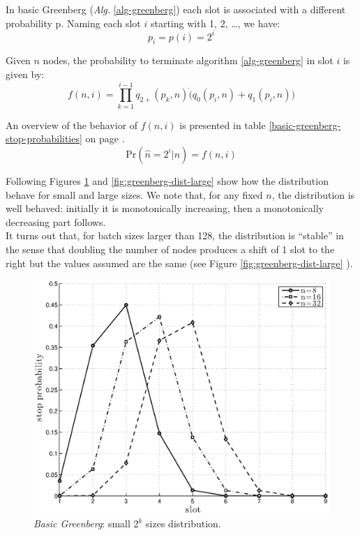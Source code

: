 \documentclass[12pt,a4paper]{report}
\begin{document}
In basic Greenberg (\emph{Alg.} \ref{alg-greenberg}) each slot is associated with a different probability p. Naming each slot $i$ starting with 1, 2, \dots, we have:
\begin{equation}
	p_{i}=p(i)=2^{i}
\end{equation}

Given $n$ nodes, the probability to terminate algorithm \ref{alg-greenberg} in slot $i$ is given by:
\begin{equation}
f(n,i)=\prod_{k=1}^{i-1}q_{2+}(p_{k},n) \dot (q_{0}(p_{i},n)+q_{1}(p_{i},n))  
\label{eq:bgstopprobability}
\end{equation}

An overview of the behavior of $f(n,i)$ is presented in table \ref{basic-greenberg-stop-probabilities} on page \pageref{basic-greenberg-stop-probabilities}.\\
\begin{equation}
\textrm{Pr}\left( \hat{n}=2^{i}|n\right)=f(n,i)  
\end{equation}

Following Figures \ref{fig:greenberg-dist-small} and \ref{fig:greenberg-dist-large} show how the distribution behave for small and large sizes.
We note that, for any fixed $n$, the distribution is well behaved: initially it is monotonically increasing, then a monotonically decreasing part follows.\\
It turns out that, for batch sizes larger than 128, the distribution is ``stable'' in the sense that doubling the number of nodes produces a shift of 1 slot to the right but the values assumed are the same (see Figure \ref{fig:greenberg-dist-large} ).\\


\begin{figure}[htbp]
\begin{center}
\includegraphics[scale=0.7]{matlab/Greenberg_stop_prob/greenberg-stop-distribution-uniformity-init}
\caption{\emph{Basic Greenberg}:  small $2^{k}$ sizes distribution.}
\label{fig:greenberg-dist-small}
\end{center}
\end{figure}
\end{document}
